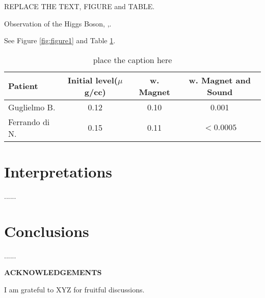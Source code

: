 \documentclass[10pt]{article}
\def\Acknowledgements{\bigskip  \bigskip \begin{center} \begin{large}
             \bf ACKNOWLEDGEMENTS \end{large}\end{center}}
\begin{document}
REPLACE THE TEXT, FIGURE and TABLE.

Observation of the Higgs Boson,  \cite{Aad:2012tfa},\cite{Chatrchyan:2012ufa}. 

 

See Figure \ref{fig:figure1} and Table \ref{tab:table1}. 

\begin{table}[t]
\begin{center}
\begin{tabular}{l|ccc}  
Patient &  Initial level($\mu$g/cc) &  w. Magnet &  
w. Magnet and Sound \\ \hline
 Guglielmo B.  &   0.12     &     0.10      &     0.001  \\
 Ferrando di N. &  0.15     &     0.11      &  $< 0.0005$ \\ \hline
\end{tabular}
\caption{ place the caption here }
\label{tab:table1}
\end{center}
\end{table}

\section{Interpretations}

......

\section{Conclusions}

...... 

\Acknowledgements
I am grateful to XYZ for fruitful discussions.
\end{document}
